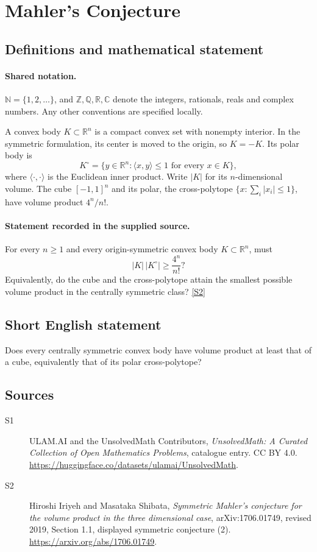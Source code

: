 \documentclass[11pt]{article}
\newcommand{\sref}[2]{\hyperlink{source:#1:#2}{[S#2]}}
\begin{document}
\section{Mahler's Conjecture}\label{statement}

\subsection{Definitions and mathematical statement}

\paragraph{Shared notation.}$\mathbb N=\{1,2,\ldots\}$, and $\mathbb Z,\mathbb Q,\mathbb R,\mathbb C$ denote the integers, rationals, reals and complex numbers. Any other conventions are specified locally.


A convex body \(K\subset\mathbb R^n\) is a compact convex set with
nonempty interior.  In the symmetric formulation, its center is moved
to the origin, so \(K=-K\).  Its polar body is
\[
 K^\circ=\{y\in\mathbb R^n:\langle x,y\rangle\le1
                           \text{ for every }x\in K\},
\]
where \(\langle\cdot,\cdot\rangle\) is the Euclidean inner product.
Write \(|K|\) for its \(n\)-dimensional volume.  The cube
\([-1,1]^n\) and its polar, the cross-polytope
\(\{x:\sum_i|x_i|\le1\}\), have volume product \(4^n/n!\).
\paragraph{Statement recorded in the supplied source.}
For every \(n\ge1\) and every origin-symmetric convex body
\(K\subset\mathbb R^n\), must
\[
 |K|\,|K^\circ|\ge\frac{4^n}{n!}?
\]
Equivalently, do the cube and the cross-polytope attain the smallest
possible volume product in the centrally symmetric class? \sref{statement}{2}
\subsection{Short English statement}
Does every centrally symmetric convex body have volume product at least that of a cube, equivalently that of its polar cross-polytope?
\subsection{Sources}
\begin{description}
\item[\hypertarget{source:statement:1}{S1}] ULAM.AI and the UnsolvedMath Contributors, \emph{UnsolvedMath: A Curated Collection of Open Mathematics Problems}, catalogue entry. CC BY 4.0. \url{https://huggingface.co/datasets/ulamai/UnsolvedMath}.
\item[\hypertarget{source:statement:2}{S2}] Hiroshi Iriyeh and Masataka Shibata, \emph{Symmetric Mahler's conjecture for the volume product in the three dimensional case}, arXiv:1706.01749, revised 2019, Section 1.1, displayed symmetric conjecture (2). \url{https://arxiv.org/abs/1706.01749}.
\end{description}
\label{end:statement}
\end{document}
